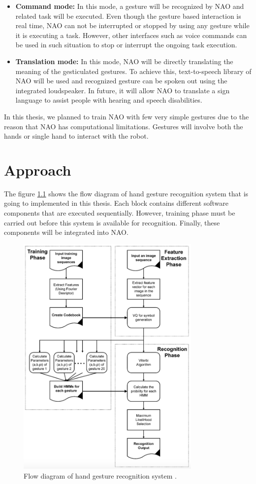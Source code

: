 \begin{itemize}
	\item \textbf{Command mode:} In this mode, a gesture will be recognized by NAO and related task will be executed. Even though the gesture based interaction is real time, NAO can not be interrupted or stopped by using any gesture while it is executing a task. However, other interfaces such as voice commands can be used in such situation to stop or interrupt the ongoing task execution.
	\item \textbf{Translation mode:} In this mode, NAO will be directly translating the meaning of the gesticulated gestures. To achieve this, text-to-speech library of NAO will be used and recognized gesture can be spoken out using the integrated loudspeaker. In future, it will allow NAO to translate a sign language to assist people with hearing and speech disabilities.
\end{itemize}

In this thesis, we planned to train NAO with few very simple gestures due to the reason that NAO has computational limitations. Gestures will involve both the hands or single hand to interact with the robot.

\chapter{Approach} The figure \ref{fig:flow} shows the flow diagram of hand gesture recognition system that is going to implemented in this thesis. Each block contains different software components that are executed sequentially. However, training phase must be carried out before this system is available for recognition. Finally, these components will be integrated into NAO.

\begin{figure}
	[!h] \centering 
	\includegraphics[width=9cm]{figures/flow.png} \caption{Flow diagram of hand gesture recognition system \cite{5}.} \label{fig:flow} 
\end{figure}

